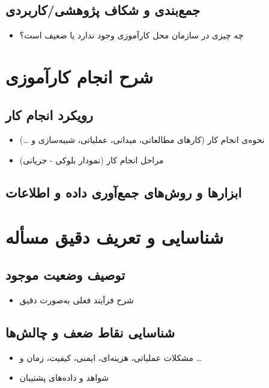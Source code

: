 \documentclass{chamranintern}
\begin{document}
\section{جمع‌بندی و شکاف پژوهشی/کاربردی}
\begin{itemize}
  \item چه چیزی در سازمان محل کارآموزی وجود ندارد یا ضعیف است؟
\end{itemize}

\chapter{شرح انجام کارآموزی}
\section{رویکرد انجام کار}
\begin{itemize}
  \item نحوه‌ی انجام کار (کارهای مطالعاتی، میدانی، عملیاتی، شبیه‌سازی و \ldots)
  \item مراحل انجام کار (نمودار بلوکی - جریانی)
\end{itemize}

\section{ابزارها و روش‌های جمع‌آوری داده و اطلاعات}

\chapter{شناسایی و تعریف دقیق مسأله}
\section{توصیف وضعیت موجود}
\begin{itemize}
  \item شرح فرآیند فعلی به‌صورت دقیق
\end{itemize}

\section{شناسایی نقاط ضعف و چالش‌ها}
\begin{itemize}
  \item مشکلات عملیاتی، هزینه‌ای، ایمنی، کیفیت، زمان و \ldots
  \item شواهد و داده‌های پشتیبان
\end{itemize}
\end{document}
